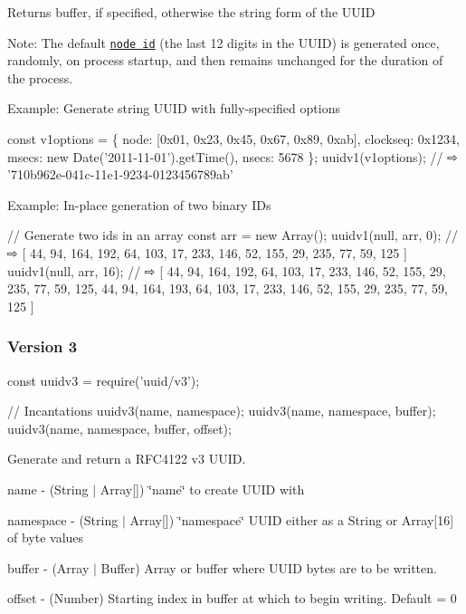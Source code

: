 Returns {\ttfamily buffer}, if specified, otherwise the string form of the U\+U\+ID

Note\+: The default \href{https://tools.ietf.org/html/rfc4122#section-4.1.6}{\tt node id} (the last 12 digits in the U\+U\+ID) is generated once, randomly, on process startup, and then remains unchanged for the duration of the process.

Example\+: Generate string U\+U\+ID with fully-\/specified options


\begin{DoxyCode}
const v1options = \{
  node: [0x01, 0x23, 0x45, 0x67, 0x89, 0xab],
  clockseq: 0x1234,
  msecs: new Date('2011-11-01').getTime(),
  nsecs: 5678
\};
uuidv1(v1options); // ⇨ '710b962e-041c-11e1-9234-0123456789ab'
\end{DoxyCode}


Example\+: In-\/place generation of two binary I\+Ds


\begin{DoxyCode}
// Generate two ids in an array
const arr = new Array();
uuidv1(null, arr, 0);  // ⇨ [ 44, 94, 164, 192, 64, 103, 17, 233, 146, 52, 155, 29, 235, 77, 59, 125 ]
uuidv1(null, arr, 16); // ⇨ [ 44, 94, 164, 192, 64, 103, 17, 233, 146, 52, 155, 29, 235, 77, 59, 125, 44,
       94, 164, 193, 64, 103, 17, 233, 146, 52, 155, 29, 235, 77, 59, 125 ]
\end{DoxyCode}


\subsubsection*{Version 3}


\begin{DoxyCode}
const uuidv3 = require('uuid/v3');

// Incantations
uuidv3(name, namespace);
uuidv3(name, namespace, buffer);
uuidv3(name, namespace, buffer, offset);
\end{DoxyCode}


Generate and return a R\+F\+C4122 v3 U\+U\+ID.


\begin{DoxyItemize}
\item {\ttfamily name} -\/ (String $\vert$ Array\mbox{[}\mbox{]}) \char`\"{}name\char`\"{} to create U\+U\+ID with
\item {\ttfamily namespace} -\/ (String $\vert$ Array\mbox{[}\mbox{]}) \char`\"{}namespace\char`\"{} U\+U\+ID either as a String or Array\mbox{[}16\mbox{]} of byte values
\item {\ttfamily buffer} -\/ (Array $\vert$ Buffer) Array or buffer where U\+U\+ID bytes are to be written.
\item {\ttfamily offset} -\/ (Number) Starting index in {\ttfamily buffer} at which to begin writing. Default = 0
\end{DoxyItemize}


